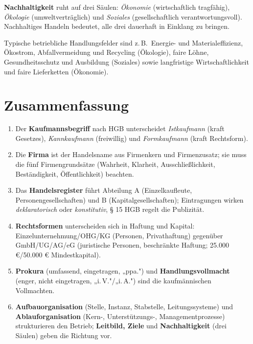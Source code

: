 \documentclass[11pt, a4paper]{article}
\begin{document}
\begin{merksatz}
\textbf{Nachhaltigkeit} ruht auf drei Säulen: \emph{Ökonomie} (wirtschaftlich tragfähig),
\emph{Ökologie} (umweltverträglich) und \emph{Soziales} (gesellschaftlich verantwortungs\-voll).
Nachhaltiges Handeln bedeutet, alle drei dauerhaft in Einklang zu bringen.
\end{merksatz}

Typische betriebliche Handlungsfelder sind z.\,B.\ Energie- und Materialeffizienz,
Ökostrom, Abfallvermeidung und Recycling (Ökologie), faire Löhne, Gesundheits\-schutz und
Ausbildung (Soziales) sowie langfristige Wirtschaftlichkeit und faire Lieferketten
(Ökonomie).

\section{Zusammenfassung}

\begin{enumerate}
  \item Der \textbf{Kaufmannsbegriff} nach HGB unterscheidet \emph{Istkaufmann} (kraft Gesetzes), \emph{Kannkaufmann} (freiwillig) und \emph{Formkaufmann} (kraft Rechtsform).
  \item Die \textbf{Firma} ist der Handelsname aus Firmenkern und Firmenzusatz; sie muss die fünf Firmengrundsätze (Wahrheit, Klarheit, Ausschließlichkeit, Beständigkeit, Öffentlichkeit) beachten.
  \item Das \textbf{Handelsregister} führt Abteilung A (Einzelkaufleute, Personengesellschaften) und B (Kapitalgesellschaften); Eintragungen wirken \emph{deklaratorisch} oder \emph{konstitutiv}, § 15 HGB regelt die Publizität.
  \item \textbf{Rechtsformen} unterscheiden sich in Haftung und Kapital: Einzelunternehmung/OHG/KG (Personen, Privathaftung) gegenüber GmbH/UG/AG/eG (juristische Personen, beschränkte Haftung; 25.000 €/50.000 € Mindestkapital).
  \item \textbf{Prokura} (umfassend, eingetragen, „ppa.") und \textbf{Handlungsvollmacht} (enger, nicht eingetragen, „i.\,V."/„i.\,A.") sind die kaufmännischen Vollmachten.
  \item \textbf{Aufbauorganisation} (Stelle, Instanz, Stabstelle, Leitungssysteme) und \textbf{Ablauforganisation} (Kern-, Unterstützungs-, Managementprozesse) strukturieren den Betrieb; \textbf{Leitbild, Ziele} und \textbf{Nachhaltigkeit} (drei Säulen) geben die Richtung vor.
\end{enumerate}
\end{document}
